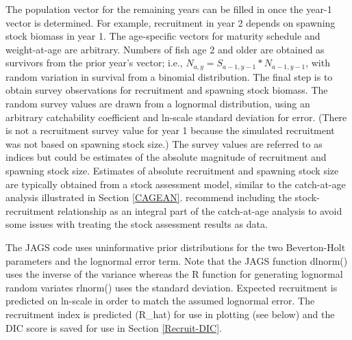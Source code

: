 \documentclass[
]{krantz}
\begin{document}
The population vector for the remaining years can be filled in once the year-1 vector is determined. For example, recruitment in year 2 depends on spawning stock biomass in year 1. The age-specific vectors for maturity schedule and weight-at-age are arbitrary. Numbers of fish age 2 and older are obtained as survivors from the prior year's vector; i.e., \(N_{a,y}=S_{a-1,y-1}*N_{a-1,y-1}\), with random variation in survival from a binomial distribution. The final step is to obtain survey observations for recruitment and spawning stock biomass. The random survey values are drawn from a lognormal distribution, using an arbitrary catchability coefficient and ln-scale standard deviation for error. (There is not a recruitment survey value for year 1 because the simulated recruitment was not based on spawning stock size.) The survey values are referred to as indices but could be estimates of the absolute magnitude of recruitment and spawning stock size. Estimates of absolute recruitment and spawning stock size are typically obtained from a stock assessment model, similar to the catch-at-age analysis illustrated in Section \ref{CAGEAN}. \citet{brooks.deroba_2015} recommend including the stock-recruitment relationship as an integral part of the catch-at-age analysis to avoid some issues with treating the stock assessment results as data.

The JAGS code uses uninformative prior distributions for the two Beverton-Holt parameters and the lognormal error term. Note that the JAGS function dlnorm() uses the inverse of the variance whereas the R function for generating lognormal random variates rlnorm() uses the standard deviation. Expected recruitment is predicted on ln-scale in order to match the assumed lognormal error. The recruitment index is predicted (R\_hat) for use in plotting (see below) and the DIC score is saved for use in Section \ref{Recruit-DIC}.
\end{document}
